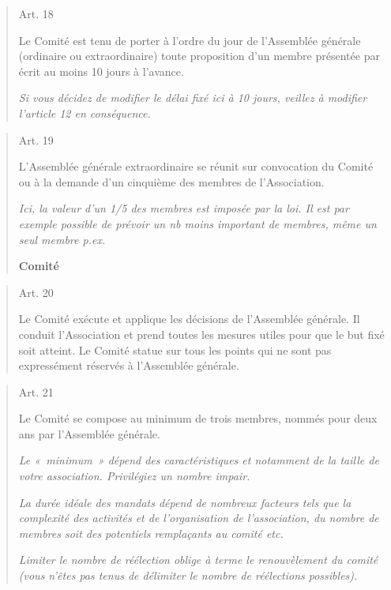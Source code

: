 \documentclass[10pt]{article}
\begin{document}
\begin{quote}
Art. 18

Le Comité est tenu de porter à l'ordre du jour de l'Assemblée générale
(ordinaire ou extraordinaire) toute proposition d'un membre présentée
par écrit au moins 10 jours à l'avance.

\emph{Si vous décidez de modifier le délai fixé ici à 10 jours, veillez
à modifier l'article 12 en conséquence.}

\end{quote}
\begin{quote}
Art. 19

L'Assemblée générale extraordinaire se réunit sur convocation du Comité
ou à la demande d'un cinquième des membres de l'Association.

\emph{Ici, la valeur d'un 1/5 des membres est imposée par la loi. Il est
par exemple possible de prévoir un nb moins important de membres, même
un seul membre p.ex.}

\textbf{Comité}

\end{quote}
\begin{quote}
Art. 20

Le Comité exécute et applique les décisions de l'Assemblée générale. Il
conduit l'Association et prend toutes les mesures utiles pour que le but
fixé soit atteint. Le Comité statue sur tous les points qui ne sont pas
expressément réservés à l'Assemblée générale.

\end{quote}
\begin{quote}
Art. 21

Le Comité se compose au minimum de trois membres, nommés pour deux ans
par l'Assemblée générale.

\emph{Le «~minimum~» dépend des caractéristiques et notamment de la
taille de votre association. Privilégiez un nombre impair.}

\emph{La durée idéale des mandats dépend de nombreux facteurs tels que
la complexité des activités et de l'organisation de l'association, du
nombre de membres soit des potentiels remplaçants au comité etc.}

\emph{Limiter le nombre de réélection oblige à terme le renouvèlement du
comité (vous n'êtes pas tenus de délimiter le nombre de réélections
possibles).}

\end{quote}
\end{document}
